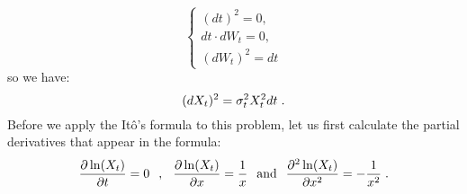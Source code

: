\documentclass[times, utf8, diplomski]{fer}
\begin{document}
\begin{equation} 
	\left\{ \begin{array}{c} (dt)^2 = 0, \\ dt\cdot dW_t = 0, \\ (dW_t)^2 = dt \end{array} \right. 
\end{equation} so we have: 
\begin{equation}
	(dX_t)^2 = \sigma_t^2X_t^2dt \hspace{0.1cm}.
\end{equation}
Before we apply the It\^{o}'s formula to this problem, let us first calculate the partial derivatives that appear in the formula:
\begin{equation}
	\frac{\partial \ln(X_t)}{\partial t} = 0 \hspace{0.25cm} , \hspace{0.25cm} \frac{\partial \ln(X_t)}{\partial x} = \frac{1}{x} \hspace{0.25cm} \mbox{and} \hspace{0.25cm} \frac{\partial^2 \ln(X_t)}{\partial x^2} = -\frac{1}{x^2} \hspace{0.1cm}.
\end{equation}
\end{document}
